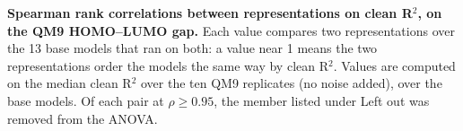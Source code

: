 
\begin{table}[H]
\centering
\caption{\textbf{\SuppFile{} Spearman rank correlations between representations on clean R$^2$, on the QM9 HOMO--LUMO gap.}
Each value compares two representations over the 13 base models that ran on both: a value near 1 means the two representations order the models the same way by clean R$^2$. Values are computed on the median clean R$^2$ over the ten QM9 replicates (no noise added), over the base models. Of each pair at $\rho \geq 0.95$, the member listed under Left out was removed from the ANOVA.}
\label{supp:representation_redundancy}
\small

\end{table}
